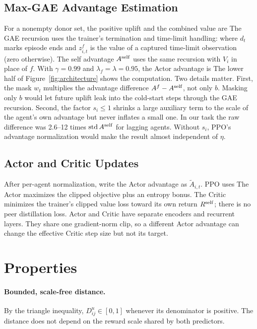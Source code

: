 \documentclass{article}
\begin{document}
\subsection{Max-GAE Advantage Estimation}
For a nonempty donor set, the positive uplift and the combined value are
\MaxEquation
The GAE recursion uses the trainer's termination and time-limit handling:
\GAEEquation
where $d_t$ marks episode ends and $z^f_{i,t}$ is the value of a captured time-limit observation (zero otherwise). The self advantage $A^{\rm self}$ uses the same recursion with $V_i$ in place of $f$. With $\gamma=0.99$ and $\lambda_f=\lambda=0.95$, the Actor advantage is
\BlendEquation
The lower half of Figure~\ref{fig:architecture} shows the computation. Two details matter. First, the mask $w_t$ multiplies the advantage difference $A^f-A^{\rm self}$, not only $b$. Masking only $b$ would let future uplift leak into the cold-start steps through the GAE recursion. Second, the factor $s_i\le1$ shrinks a large auxiliary term to the scale of the agent's own advantage but never inflates a small one. In our task the raw difference was 2.6--12 times $\operatorname{std}A^{\rm self}$ for lagging agents. Without $s_i$, PPO's advantage normalization would make the result almost independent of $\eta$.

\subsection{Actor and Critic Updates}
After per-agent normalization, write the Actor advantage as $\widetilde A_{i,t}$. PPO uses
\PPOEquation
The Actor maximizes the clipped objective plus an entropy bonus. The Critic minimizes the trainer's clipped value loss toward its own return $R^{\rm self}$; there is no peer distillation loss. Actor and Critic have separate encoders and recurrent layers. They share one gradient-norm clip, so a different Actor advantage can change the effective Critic step size but not its target.

\section{Properties}
\paragraph{Bounded, scale-free distance.} By the triangle inequality, $D_{ij}^u\in[0,1]$ whenever its denominator is positive. The distance does not depend on the reward scale shared by both predictors.
\end{document}
